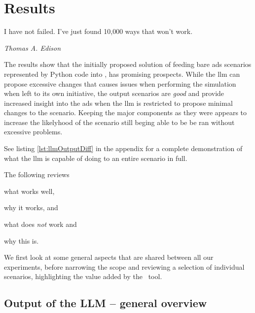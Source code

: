 \chapter{Results}\label{sec:results}

\epigraph{I have not failed. I've just found 10,000 ways that won't work.}{\textit{Thomas A.
        Edison}}

The results show that the initially proposed solution of feeding bare
\acrshort{ads} scenarios represented by Python code into , has promising prospects.
While the \acrshort{llm} can propose excessive changes that causes issues when performing the
simulation when left to its own initiative, the output scenarios are \emph{good} and provide
increased insight into the \acrshort{ads} when the \acrshort{llm} is restricted to propose minimal
changes to the scenario. Keeping the major components as they were appears to increase the
likelyhood of the scenario still beging able to be be ran without excessive problems.

See listing \ref{lst:llmOutputDiff} in the  appendix for a complete
demonstration of what the \acrlong{llm} is capable of doing to an entire scenario in full.

The following reviews \begin{inparaenum}
    \item what works well,
    \item why it works, and
    \item what does \emph{not} work and
    \item why this is.
\end{inparaenum} We first look at some general aspects that are shared between all our experiments, before narrowing
the scope and reviewing a selection of individual scenarios, highlighting the value added by the
\hefe~tool.



\section{Output of the LLM -- general overview}

